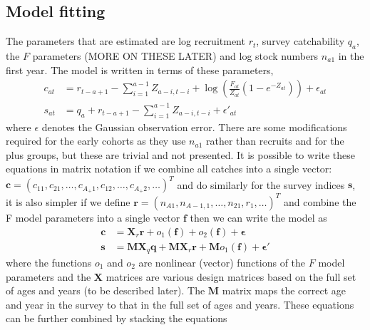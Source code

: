 \documentclass[a4paper,english]{article}
\begin{document}
\subsection{Model fitting}

The parameters that are estimated are log recruitment $r_t$, survey catchability $q_a$, the $F$ parameters (MORE ON THESE LATER) and log stock numbers $n_{a1}$ in the first year.  The model is written in terms of these parameters, 
\begin{align*}
 c_{at} &= r_{t-a+1} -\sum_{i=1}^{a-1} Z_{a-i, t-i} + \log \left( \frac{F_{at}}{Z_{at}} \left( 1 - e^{-Z_{at}} \right)\right) + \epsilon_{at} \\
 s_{at} &=  q_{a} + r_{t-a+1} -\sum_{i=1}^{a-1} Z_{a-i, t-i} + \epsilon'_{at}
\end{align*}
where $\epsilon$ denotes the Gaussian observation error.  There are some modifications required for the early cohorts as they use $n_{a1}$ rather than recruits and for the plus groups, but these are trivial and not presented.  It is possible to write these equations in matrix notation if we combine all catches into a single vector: $\bm{c} = (c_{11}, c_{21}, \ldots, c_{A_+1}, c_{12}, \ldots, c_{A_+2}, \ldots)^T$ and do similarly for the survey indices $\bm{s}$, it is also simpler if we define $\bm{r} = (n_{A1},n_{A-1,1},\ldots,n_{21},r_1,\ldots)^T$ and combine the F model parameters into a single vector $\bm{f}$ then we can write the model as 
\begin{align*}
 \bm{c} &= \bm{X}_r \bm{r} + o_1(\bm{f}) + o_2(\bm{f}) + \bm{\epsilon} \\
 \bm{s} &=  \bm{M}\bm{X}_q \bm{q} + \bm{M}\bm{X}_r \bm{r} + \bm{M} o_1(\bm{f}) + \bm{\epsilon}'
\end{align*}
where the functions $o_1$ and $o_2$ are nonlinear (vector) functions of the $F$ model parameters and the $\bm{X}$ matrices are various design matrices based on the full set of ages and years (to be described later). The $\bm{M}$ matrix maps the correct age and year in the survey to that in the full set of ages and years.  These equations can be further combined by stacking the equations
\end{document}
